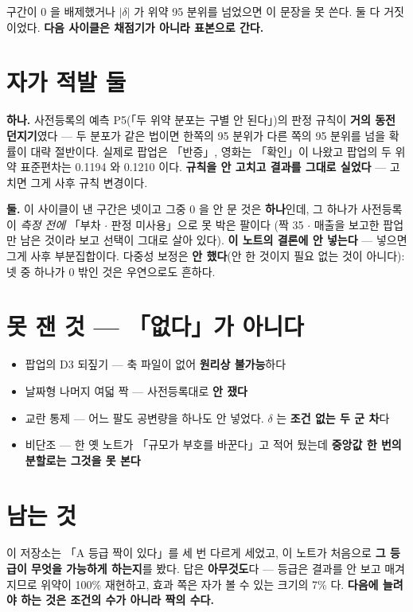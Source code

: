 \documentclass{article}
\begin{document}
{구간이 0 을 배제했거나 $|\delta|$ 가 위약 95 분위를 넘었으면 이 문장을 못 쓴다. 둘 다 거짓이었다.}
\textbf{다음 사이클은 채점기가 아니라 표본으로 간다.}

\section{자가 적발 둘}

\textbf{하나.} 사전등록의 예측 P5(「두 위약 분포는 구별 안 된다」)의 판정 규칙이
\textbf{거의 동전 던지기}였다 --- 두 분포가 같은 법이면 한쪽의 95 분위가 다른 쪽의 95 분위를
넘을 확률이 대략 절반이다. 실제로 팝업은 「반증」, 영화는 「확인」이 나왔고
팝업의 두 위약 표준편차는 0.1194 와 0.1210 이다. \textbf{규칙을 안 고치고 결과를 그대로 실었다} ---
고치면 그게 사후 규칙 변경이다.

\textbf{둘.} 이 사이클이 낸 구간은 넷이고 그중 0 을 안 문 것은 \textbf{하나}인데,
그 하나가 사전등록이 \emph{측정 전에} 「부차 $\cdot$ 판정 미사용」으로 못 박은 팔이다
(짝 35 $\cdot$ 매출을 보고한 팝업만 남은 것이라 보고 선택이 그대로 살아 있다).
\textbf{이 노트의 결론에 안 넣는다} --- 넣으면 그게 사후 부분집합이다.
다중성 보정은 \textbf{안 했다}(안 한 것이지 필요 없는 것이 아니다):
넷 중 하나가 0 밖인 것은 우연으로도 흔하다.

\section{못 잰 것 --- 「없다」가 아니다}

\begin{itemize}
\item 팝업의 D3 되짚기 --- 축 파일이 없어 \textbf{원리상 불가능}하다
\item 날짜형 나머지 여덟 짝 --- 사전등록대로 \textbf{안 쟀다}
\item 교란 통제 --- 어느 팔도 공변량을 하나도 안 넣었다. $\delta$ 는 \textbf{조건 없는 두 군 차}다
\item 비단조 --- 한 옛 노트가 「규모가 부호를 바꾼다」고 적어 뒀는데
      \textbf{중앙값 한 번의 분할로는 그것을 못 본다}
\end{itemize}

\section{남는 것}

이 저장소는 「A 등급 짝이 있다」를 세 번 다르게 세었고, 이 노트가 처음으로
\textbf{그 등급이 무엇을 가능하게 하는지}를 봤다. 답은 \textbf{아무것도}다 ---
등급은 결과를 안 보고 매겨지므로 위약이 100\% 재현하고,
효과 쪽은 자가 볼 수 있는 크기의 7\% 다.
\textbf{다음에 늘려야 하는 것은 조건의 수가 아니라 짝의 수다.}
\end{document}
